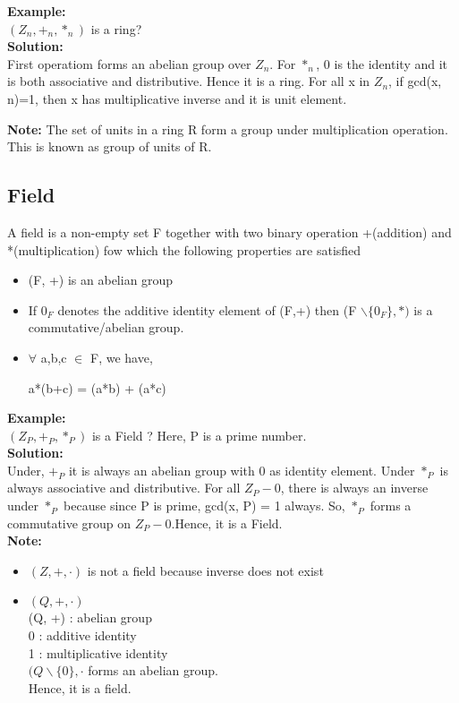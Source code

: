 \documentclass[11pt]{article}
\begin{document}
\textbf{Example:}\\
$(Z_n, +_n, *_n)$ is a ring?\\
\textbf{Solution:}\\
First operatiom forms an abelian group over $Z_n$. For $*_n$, 0 is the identity and it is both associative and distributive. Hence it is a ring. For all x in $Z_n$, if gcd(x, n)=1, then x has multiplicative inverse and it is unit element.

\textbf{Note:} The set of units in a ring R form a group under multiplication operation. This is known as group of units of R.

\subsection{Field}
A field is a non-empty set F together with two binary operation +(addition) and *(multiplication) fow which the following properties are satisfied
\begin{itemize}
    \item (F, +) is an abelian group
    \item If $0_F$ denotes the additive identity element of (F,+) then (F $\backslash \{0_F\}, *) $ is a commutative/abelian group.
    \item $\forall$ a,b,c $\in$ F, we have,
    \begin{center}
        a*(b+c) = (a*b) + (a*c)
    \end{center}
\end{itemize}
\vspace{5mm}
\textbf{Example:}\\
$(Z_P, +_P, *_P)$ is a Field ? Here, P is a prime number.\\
\textbf{Solution:}\\
Under, $+_P$ it is always an abelian group with 0 as identity element. Under $*_P$ is always associative and distributive. For all $Z_P - 0$, there is always an inverse under $*_P$ because since P is prime, gcd(x, P) = 1 always. So, $*_P$ forms a commutative group on $Z_P-0$.Hence, it is a Field.\\
\vspace{3mm}
\textbf{Note:}\\
\begin{itemize}
    \item $(Z, +, \cdot)$ is not a field because inverse does not exist
    \item $(Q, +, \cdot)$\\
    (Q, +) : abelian group\\
    0 : additive identity\\
    1 : multiplicative identity\\
    $(Q \backslash \{0\}, \cdot$ forms an abelian group.\\
    Hence, it is a field.
\end{itemize}
\end{document}
